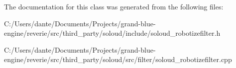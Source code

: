 The documentation for this class was generated from the following files\+:\begin{DoxyCompactItemize}
\item 
C\+:/\+Users/dante/\+Documents/\+Projects/grand-\/blue-\/engine/reverie/src/third\+\_\+party/soloud/include/soloud\+\_\+robotizefilter.\+h\item 
C\+:/\+Users/dante/\+Documents/\+Projects/grand-\/blue-\/engine/reverie/src/third\+\_\+party/soloud/src/filter/soloud\+\_\+robotizefilter.\+cpp\end{DoxyCompactItemize}

